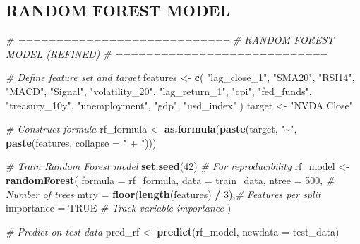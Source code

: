 \documentclass[
]{article}
\newenvironment{Shaded}{\begin{snugshade}}{\end{snugshade}}
\newcommand{\AttributeTok}[1]{\textcolor[rgb]{0.13,0.29,0.53}{#1}}
\newcommand{\CommentTok}[1]{\textcolor[rgb]{0.56,0.35,0.01}{\textit{#1}}}
\newcommand{\ConstantTok}[1]{\textcolor[rgb]{0.56,0.35,0.01}{#1}}
\newcommand{\DecValTok}[1]{\textcolor[rgb]{0.00,0.00,0.81}{#1}}
\newcommand{\FunctionTok}[1]{\textcolor[rgb]{0.13,0.29,0.53}{\textbf{#1}}}
\newcommand{\NormalTok}[1]{#1}
\newcommand{\OtherTok}[1]{\textcolor[rgb]{0.56,0.35,0.01}{#1}}
\newcommand{\SpecialCharTok}[1]{\textcolor[rgb]{0.81,0.36,0.00}{\textbf{#1}}}
\newcommand{\StringTok}[1]{\textcolor[rgb]{0.31,0.60,0.02}{#1}}
\begin{document}
\subsection{RANDOM FOREST MODEL}\label{random-forest-model}

\begin{Shaded}
\begin{Highlighting}[]
\CommentTok{\# ============================}
\CommentTok{\#  RANDOM FOREST MODEL (REFINED)}
\CommentTok{\# ============================}

\CommentTok{\#  Define feature set and target}
\NormalTok{features }\OtherTok{\textless{}{-}} \FunctionTok{c}\NormalTok{(}
  \StringTok{"lag\_close\_1"}\NormalTok{, }\StringTok{"SMA20"}\NormalTok{, }\StringTok{"RSI14"}\NormalTok{, }\StringTok{"MACD"}\NormalTok{, }\StringTok{"Signal"}\NormalTok{,}
  \StringTok{"volatility\_20"}\NormalTok{, }\StringTok{"lag\_return\_1"}\NormalTok{,}
  \StringTok{"cpi"}\NormalTok{, }\StringTok{"fed\_funds"}\NormalTok{, }\StringTok{"treasury\_10y"}\NormalTok{, }\StringTok{"unemployment"}\NormalTok{,}
  \StringTok{"gdp"}\NormalTok{, }\StringTok{"usd\_index"}
\NormalTok{)}
\NormalTok{target }\OtherTok{\textless{}{-}} \StringTok{"NVDA.Close"}

\CommentTok{\#   Construct formula}
\NormalTok{rf\_formula }\OtherTok{\textless{}{-}} \FunctionTok{as.formula}\NormalTok{(}\FunctionTok{paste}\NormalTok{(target, }\StringTok{"\textasciitilde{}"}\NormalTok{, }\FunctionTok{paste}\NormalTok{(features, }\AttributeTok{collapse =} \StringTok{" + "}\NormalTok{)))}

\CommentTok{\#  Train Random Forest model}
\FunctionTok{set.seed}\NormalTok{(}\DecValTok{42}\NormalTok{)  }\CommentTok{\# For reproducibility}
\NormalTok{rf\_model }\OtherTok{\textless{}{-}} \FunctionTok{randomForest}\NormalTok{(}
  \AttributeTok{formula =}\NormalTok{ rf\_formula,}
  \AttributeTok{data =}\NormalTok{ train\_data,}
  \AttributeTok{ntree =} \DecValTok{500}\NormalTok{,                        }\CommentTok{\# Number of trees}
  \AttributeTok{mtry =} \FunctionTok{floor}\NormalTok{(}\FunctionTok{length}\NormalTok{(features) }\SpecialCharTok{/} \DecValTok{3}\NormalTok{),}\CommentTok{\# Features per split}
  \AttributeTok{importance =} \ConstantTok{TRUE}                  \CommentTok{\# Track variable importance}
\NormalTok{)}

\CommentTok{\#  Predict on test data}
\NormalTok{pred\_rf }\OtherTok{\textless{}{-}} \FunctionTok{predict}\NormalTok{(rf\_model, }\AttributeTok{newdata =}\NormalTok{ test\_data)}


\end{Highlighting}
\end{Shaded}
\end{document}
